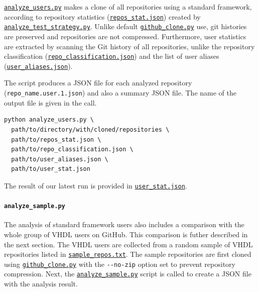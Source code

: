 \documentclass[]{article}
\let\oldparagraph\paragraph
\renewcommand{\paragraph}[1]{\oldparagraph{#1}\mbox{}}
\begin{document}
\href{https://github.com/LarsAsplund/github-facts/tree/main/py/analyze_users.py}{\texttt{analyze\_users.py}} makes a clone of all repositories using a standard framework, according to repository statistics (\href{https://github.com/LarsAsplund/github-facts/tree/main/repos_stat.json}{\texttt{repos\_stat.json}}) created by \href{https://github.com/LarsAsplund/github-facts/tree/main/py/analyze_test_strategy.py}{\texttt{analyze\_test\_strategy.py}}. Unlike default \href{https://github.com/LarsAsplund/github-facts/tree/main/py/github_clone.py}{\texttt{github\_clone.py}} use, git histories are preserved and repositories are not compressed. Furthermore, user statistics are extracted by scanning the Git history of all repositories, unlike the repository classification (\href{https://github.com/LarsAsplund/github-facts/tree/main/repo_classification.json}{\texttt{repo\_classification.json}}) and the list of user aliases (\href{https://github.com/LarsAsplund/github-facts/tree/main/user_aliases.json}{\texttt{user\_aliases.json}}).

The script produces a JSON file for each analyzed repository (\texttt{repo\_name.user.1.json}) and also a summary JSON file. The name of the output file is given in the call.

\begin{verbatim}
python analyze_users.py \
  path/to/directory/with/cloned/repositories \
  path/to/repos_stat.json \
  path/to/repo_classification.json \
  path/to/user_aliases.json \
  path/to/user_stat.json
\end{verbatim}

The result of our latest run is provided in \href{https://github.com/LarsAsplund/github-facts/tree/main/user_stat.json}{\texttt{user\_stat.json}}.

\hypertarget{analyze_sample}{%
\paragraph{\texorpdfstring{\texttt{analyze\_sample.py}}{analyze\_sample.py}}\label{analyze_sample}}

The analysis of standard framework users also includes a comparison with the whole group of VHDL users on GitHub. This comparison is futher described in the next section. The VHDL users are collected from a random sample of VHDL repositories listed in \href{https://github.com/LarsAsplund/github-facts/tree/main/sample_repos.txt}{\texttt{sample\_repos.txt}}. The sample repositories are first cloned using \href{https://github.com/LarsAsplund/github-facts/tree/main/py/github_clone.py}{\texttt{github\_clone.py}} with the \texttt{-\/-no-zip} option set to prevent repository compression. Next, the \href{https://github.com/LarsAsplund/github-facts/tree/main/py/analyze_sample.py}{\texttt{analyze\_sample.py}} script is called to create a JSON file with the analysis result.
\end{document}
